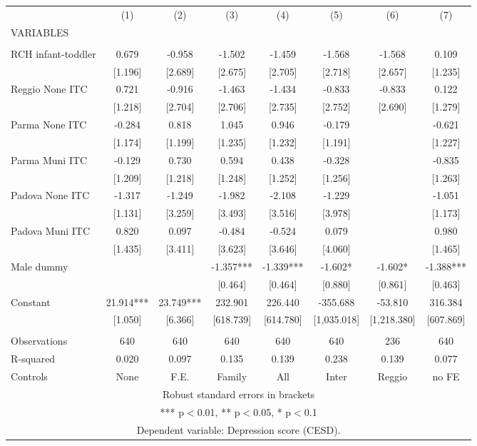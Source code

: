 \begin{tabular}{lccccccc} \hline
 & (1) & (2) & (3) & (4) & (5) & (6) & (7) \\
VARIABLES &  &  &  &  &  &  &  \\ \hline
 &  &  &  &  &  &  &  \\
RCH infant-toddler & 0.679 & -0.958 & -1.502 & -1.459 & -1.568 & -1.568 & 0.109 \\
 & [1.196] & [2.689] & [2.675] & [2.705] & [2.718] & [2.657] & [1.235] \\
Reggio None ITC & 0.721 & -0.916 & -1.463 & -1.434 & -0.833 & -0.833 & 0.122 \\
 & [1.218] & [2.704] & [2.706] & [2.735] & [2.752] & [2.690] & [1.279] \\
Parma None ITC & -0.284 & 0.818 & 1.045 & 0.946 & -0.179 &  & -0.621 \\
 & [1.174] & [1.199] & [1.235] & [1.232] & [1.191] &  & [1.227] \\
Parma Muni ITC & -0.129 & 0.730 & 0.594 & 0.438 & -0.328 &  & -0.835 \\
 & [1.209] & [1.218] & [1.248] & [1.252] & [1.256] &  & [1.263] \\
Padova None ITC & -1.317 & -1.249 & -1.982 & -2.108 & -1.229 &  & -1.051 \\
 & [1.131] & [3.259] & [3.493] & [3.516] & [3.978] &  & [1.173] \\
Padova Muni ITC & 0.820 & 0.097 & -0.484 & -0.524 & 0.079 &  & 0.980 \\
 & [1.435] & [3.411] & [3.623] & [3.646] & [4.060] &  & [1.465] \\
Male dummy &  &  & -1.357*** & -1.339*** & -1.602* & -1.602* & -1.388*** \\
 &  &  & [0.464] & [0.464] & [0.880] & [0.861] & [0.463] \\
Constant & 21.914*** & 23.749*** & 232.901 & 226.440 & -355.688 & -53.810 & 316.384 \\
 & [1.050] & [6.366] & [618.739] & [614.780] & [1,035.018] & [1,218.380] & [607.869] \\
 &  &  &  &  &  &  &  \\
Observations & 640 & 640 & 640 & 640 & 640 & 236 & 640 \\
R-squared & 0.020 & 0.097 & 0.135 & 0.139 & 0.238 & 0.139 & 0.077 \\
 Controls & None & F.E. & Family & All & Inter & Reggio & no FE \\ \hline
\multicolumn{8}{c}{ Robust standard errors in brackets} \\
\multicolumn{8}{c}{ *** p$<$0.01, ** p$<$0.05, * p$<$0.1} \\
\multicolumn{8}{c}{ Dependent variable: Depression score (CESD).} \\
\end{tabular}

